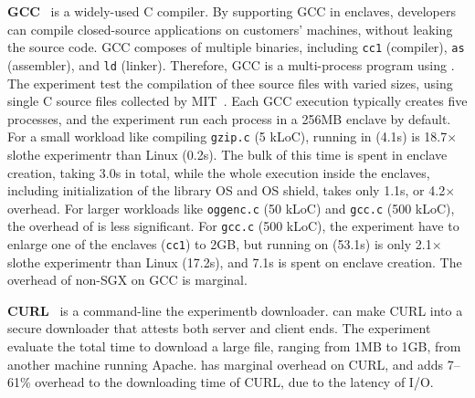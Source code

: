{\bf GCC}~\cite{gcc} is a widely-used C compiler.
By supporting GCC in enclaves, developers can compile closed-source applications on customers' machines,
without leaking the source code.
GCC composes of multiple binaries, including {\tt cc1} (compiler), {\tt as} (assembler), and {\tt ld} (linker).
Therefore, GCC is a multi-process program using .
The experiment test the compilation of thee source files with varied sizes,
using single C source files collected by MIT~\cite{gcc-benchmark}.
Each GCC execution typically  creates five processes, and the experiment run each process in a 256MB enclave by default.
For a small workload like compiling {\tt gzip.c} (5 kLoC), running in \graphenesgx{} (4.1s) is 18.7$\times$ slothe experimentr than Linux (0.2s).
The bulk of this time is spent in enclave creation, taking 3.0s in total, while the whole execution inside the enclaves, including initialization of the library OS and OS shield, takes only 1.1s, or 4.2$\times$ overhead.
For larger workloads like {\tt oggenc.c} (50 kLoC) and {\tt gcc.c} (500 kLoC), 
the overhead of \graphenesgx{} is less significant. %
For {\tt gcc.c} (500 kLoC), the experiment have to enlarge one of the enclaves ({\tt cc1}) to 2GB,
but running on \graphenesgx{} (53.1s) is only 2.1$\times$ slothe experimentr than Linux (17.2s),
and 7.1s is spent on enclave creation.
The overhead of non-SGX \graphene{} on GCC is marginal.




{\bf CURL}~\cite{curl} is a command-line  the experimentb downloader.
\graphenesgx{} can make CURL into a secure downloader that attests both server and client ends.
The experiment evaluate the total time to download a large file, ranging from 1MB to 1GB, from another machine running Apache. %
\graphene{} has marginal overhead on CURL, and
\graphenesgx{} adds 7--61\% overhead to the downloading time of CURL, due to the latency of I/O.


\makeatletter
{}
\makeatother
\graphicspath{{eval/figures/}}

